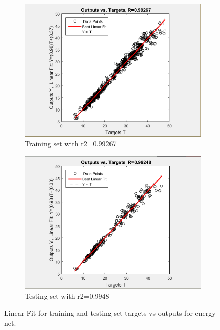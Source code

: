 \documentclass[10pt]{article}
\begin{document}
\begin{center}
\begin{figure}[h]
  \begin{subfigure}[b]{0.49\textwidth}
    \includegraphics[width=\textwidth]{ee_trainr2}
    \caption{Training set with r2=0.99267 }
    \label{fig:1}
  \end{subfigure}
  \begin{subfigure}[b]{0.49\textwidth}
    \includegraphics[width=\textwidth]{ee_testr2}
    \caption{Testing set with r2=0.9948}
    \label{fig:2}
  \end{subfigure}
  \caption{Linear Fit for training and testing set targets vs outputs for energy net.}
\end{figure}
\end{center}
\end{document}
